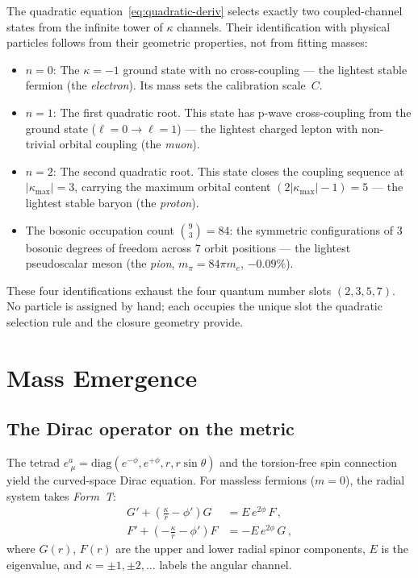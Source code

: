 \documentclass[aps,prd,twocolumn,superscriptaddress,nofootinbib,longbibliography]{revtex4-2}
\newcommand{\kmax}{|\kappa_{\mathrm{max}}|}
\begin{document}
The quadratic equation~\eqref{eq:quadratic-deriv} selects exactly two
coupled-channel states from the infinite tower of $\kappa$ channels.
Their identification with physical particles follows from their
geometric properties, not from fitting masses:
\begin{itemize}
\item $n=0$: The $\kappa=-1$ ground state with no cross-coupling ---
  the lightest stable fermion (the \textit{electron}).  Its mass sets
  the calibration scale~$C$.
\item $n=1$: The first quadratic root.  This state has p-wave
  cross-coupling from the ground state ($\ell=0 \to \ell=1$) --- the
  lightest charged lepton with non-trivial orbital coupling (the
  \textit{muon}).
\item $n=2$: The second quadratic root.  This state closes the
  coupling sequence at $\kmax=3$, carrying the maximum orbital
  content $(2\kmax-1)=5$ --- the lightest stable baryon (the
  \textit{proton}).
\item The bosonic occupation count $\binom{9}{3} = 84$: the symmetric
  configurations of 3 bosonic degrees of freedom across 7 orbit
  positions --- the lightest pseudoscalar meson (the \textit{pion},
  $m_\pi = 84\pi m_e$, $-0.09\%$).
\end{itemize}
These four identifications exhaust the four quantum number slots
$(2,3,5,7)$.  No particle is assigned by hand; each occupies the
unique slot the quadratic selection rule and the closure geometry
provide.

\section{Mass Emergence}\label{sec:mass}

\subsection{The Dirac operator on the metric}

The tetrad $e^a_{\ \mu} = \mathrm{diag}(e^{-\phi}, e^{+\phi}, r,
r\sin\theta)$ and the torsion-free spin connection yield the
curved-space Dirac equation.  For massless fermions ($m = 0$), the
radial system takes \emph{Form~T}:
\begin{align}\label{eq:formT}
  G' + \!\left(\frac{\kappa}{r} - \phi'\right)\!G
    &= E\,e^{2\phi}\,F\,, \nonumber\\
  F' + \!\left(-\frac{\kappa}{r} - \phi'\right)\!F
    &= -E\,e^{2\phi}\,G\,,
\end{align}
where $G(r)$, $F(r)$ are the upper and lower radial spinor components,
$E$ is the eigenvalue, and $\kappa = \pm 1, \pm 2, \ldots$ labels the
angular channel.
\end{document}
